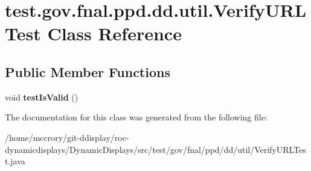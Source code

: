 \hypertarget{classtest_1_1gov_1_1fnal_1_1ppd_1_1dd_1_1util_1_1VerifyURLTest}{\section{test.\-gov.\-fnal.\-ppd.\-dd.\-util.\-Verify\-U\-R\-L\-Test Class Reference}
\label{classtest_1_1gov_1_1fnal_1_1ppd_1_1dd_1_1util_1_1VerifyURLTest}
}
\subsection*{Public Member Functions}
\begin{DoxyCompactItemize}
\item 
\hypertarget{classtest_1_1gov_1_1fnal_1_1ppd_1_1dd_1_1util_1_1VerifyURLTest_af32f5fa58e9b7d0ae024d2fa9e703ba2}{void {\bfseries test\-Is\-Valid} ()}\label{classtest_1_1gov_1_1fnal_1_1ppd_1_1dd_1_1util_1_1VerifyURLTest_af32f5fa58e9b7d0ae024d2fa9e703ba2}

\end{DoxyCompactItemize}


The documentation for this class was generated from the following file\-:\begin{DoxyCompactItemize}
\item 
/home/mccrory/git-\/ddisplay/roc-\/dynamicdisplays/\-Dynamic\-Displays/src/test/gov/fnal/ppd/dd/util/Verify\-U\-R\-L\-Test.\-java\end{DoxyCompactItemize}
